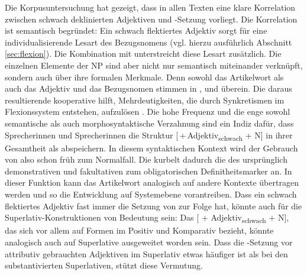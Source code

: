 Die Korpusuntersuchung  hat gezeigt, dass in allen Texten eine klare Korrelation zwischen schwach deklinierten Adjektiven  und -Setzung vorliegt. Die Korrelation ist semantisch begründet: Ein schwach flektiertes  Adjektiv  sorgt für eine individualisierende Lesart des Bezugsnomens (vgl. hierzu ausführlich Abschnitt \ref{sec:flexion}). Die Kombination mit  unterstreicht diese Lesart zusätzlich.  Die einzelnen Elemente der  NP sind aber nicht nur semantisch miteinander verknüpft, sondern auch über ihre formalen Merkmale. Denn sowohl das Artikelwort als auch das Adjektiv  und das Bezugsnomen stimmen in ,  und  überein. Die daraus resultierende kooperative   hilft, Mehrdeutigkeiten, die durch Synkretismen im Flexionssystem  entstehen, aufzulösen \parencite[127]{Szczepaniak2010}. Die hohe Frequenz und die enge sowohl semantische als auch morphosyntaktische Verzahnung sind ein Indiz dafür, dass Sprecherinnen und Sprecherinnen die Struktur  [\,+\,Adjektiv\textsubscript{schwach} + N] in ihrer Gesamtheit als  abspeichern. In diesem syntaktischen Kontext wird der Gebrauch von  also schon früh zum Normalfall. Die  kurbelt dadurch die  des ursprünglich demonstrativen und fakultativen  zum obligatorischen Definitheitsmarker an. In dieser Funktion kann das Artikelwort analogisch  auf andere Kontexte übertragen werden und so die Entwicklung auf Systemebene vorantreiben. Dass ein schwach flektiertes  Adjektiv  fast immer die Setzung von  zur Folge hat, könnte auch für die Superlativ-Konstruktionen von Bedeutung sein: Das  [ + Adjektiv\textsubscript{schwach} + N], das sich vor allem auf Formen im Positiv und Komparativ bezieht, könnte analogisch  auch auf Superlative ausgeweitet worden sein. Dass die -Setzung vor attributiv gebrauchten Adjektiven  im Superlativ etwas häufiger ist als bei den substantivierten  Superlativen,  stützt diese Vermutung. 

